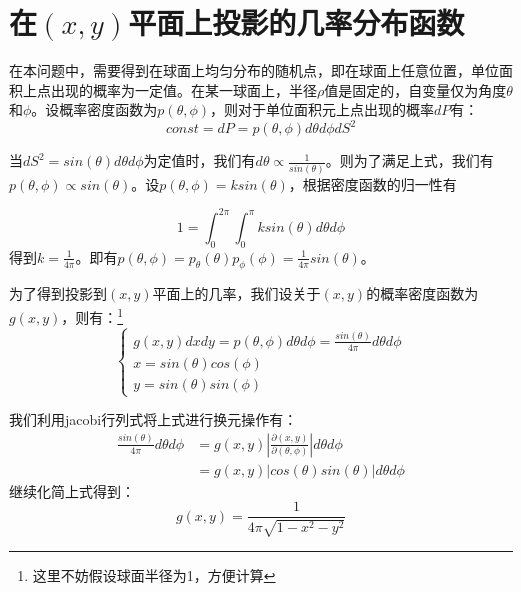 \documentclass[a4paper,11pt]{article}
\begin{document}
\section{在$(x,y)$平面上投影的几率分布函数}

在本问题中，需要得到在球面上均匀分布的随机点，即在球面上任意位置，单位面积上点出现的概率为一定值。在某一球面上，半径$\rho$值是固定的，自变量仅为角度$\theta$和$\phi$。设概率密度函数为$p(\theta,\phi)$，则对于单位面积元上点出现的概率$d P$有：
\begin{equation}
	const = d P =p(\theta,\phi)d \theta d \phi dS^{2}
\end{equation}

当$d S^{2}= sin(\theta)d \theta d \phi $为定值时，我们有$d\theta \propto \frac{1}{sin(\theta)}$。则为了满足上式，我们有$p(\theta,\phi) \propto sin(\theta)$。设$p(\theta,\phi) = ksin(\theta)$，根据密度函数的归一性有

\begin{equation}
	1 = \int_{0}^{2\pi}\int_{0}^{\pi} k sin(\theta)d\theta d\phi 
\end{equation}
得到$k=\frac{1}{4\pi}$。即有$p(\theta,\phi)= p_{\theta}(\theta)p_{\phi}(\phi)=\frac{1}{4\pi}sin(\theta)$。

为了得到投影到$(x,y)$平面上的几率，我们设关于$(x,y)$的概率密度函数为$g(x,y)$，则有：\footnote{这里不妨假设球面半径为1，方便计算}
\begin{equation}
\left\{
\begin{array}{l}
	g(x,y)dxdy = p(\theta,\phi)d\theta d\phi = \frac{sin(\theta)}{4\pi}d\theta d\phi \\
	x=sin(\theta)cos(\phi) \\
	y=sin(\theta)sin(\phi)
\end{array}	
\right.
\end{equation}

我们利用jacobi行列式将上式进行换元操作有：
\begin{equation}
\begin{aligned}
	\frac{sin(\theta)}{4\pi} d\theta d\phi &= g(x,y)\left| \frac{\partial(x,y)}{\partial(\theta,\phi)} \right| d\theta d\phi \\
	&= g(x,y) \left| cos(\theta)sin(\theta) \right| d\theta d\phi
\end{aligned}
\end{equation}
继续化简上式得到：
\begin{equation}
	g(x,y) = \frac{1}{4\pi \sqrt{1-x^{2}-y^{2}}}
\end{equation}
\end{document}

